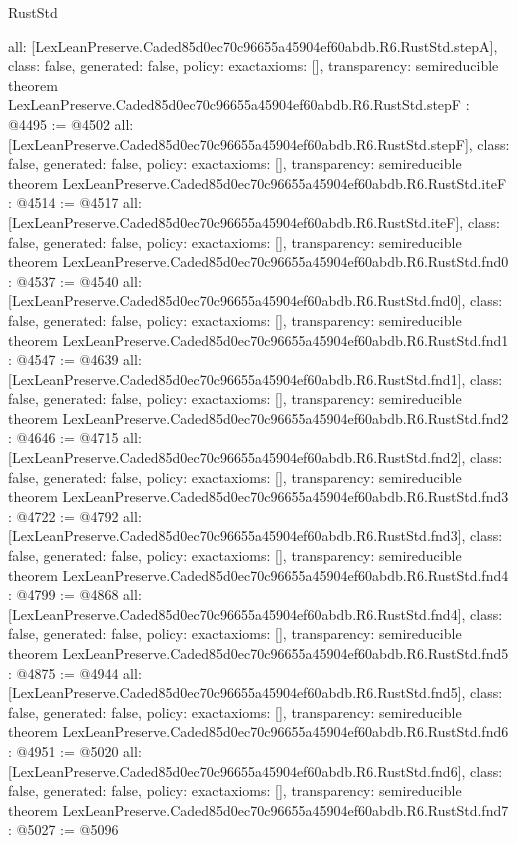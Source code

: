 \begin{lexlean}{RustStd}
\begin{coremodule}
{  all: [LexLeanPreserve.Caded85d0ec70c96655a45904ef60abdb.R6.RustStd.stepA],
  class: false,
  generated: false,
  policy: exact{axioms: []},
  transparency: semireducible
}
theorem LexLeanPreserve.Caded85d0ec70c96655a45904ef60abdb.R6.RustStd.stepF : @4495 := @4502 {
  all: [LexLeanPreserve.Caded85d0ec70c96655a45904ef60abdb.R6.RustStd.stepF],
  class: false,
  generated: false,
  policy: exact{axioms: []},
  transparency: semireducible
}
theorem LexLeanPreserve.Caded85d0ec70c96655a45904ef60abdb.R6.RustStd.iteF : @4514 := @4517 {
  all: [LexLeanPreserve.Caded85d0ec70c96655a45904ef60abdb.R6.RustStd.iteF],
  class: false,
  generated: false,
  policy: exact{axioms: []},
  transparency: semireducible
}
theorem LexLeanPreserve.Caded85d0ec70c96655a45904ef60abdb.R6.RustStd.fnd0 : @4537 := @4540 {
  all: [LexLeanPreserve.Caded85d0ec70c96655a45904ef60abdb.R6.RustStd.fnd0],
  class: false,
  generated: false,
  policy: exact{axioms: []},
  transparency: semireducible
}
theorem LexLeanPreserve.Caded85d0ec70c96655a45904ef60abdb.R6.RustStd.fnd1 : @4547 := @4639 {
  all: [LexLeanPreserve.Caded85d0ec70c96655a45904ef60abdb.R6.RustStd.fnd1],
  class: false,
  generated: false,
  policy: exact{axioms: []},
  transparency: semireducible
}
theorem LexLeanPreserve.Caded85d0ec70c96655a45904ef60abdb.R6.RustStd.fnd2 : @4646 := @4715 {
  all: [LexLeanPreserve.Caded85d0ec70c96655a45904ef60abdb.R6.RustStd.fnd2],
  class: false,
  generated: false,
  policy: exact{axioms: []},
  transparency: semireducible
}
theorem LexLeanPreserve.Caded85d0ec70c96655a45904ef60abdb.R6.RustStd.fnd3 : @4722 := @4792 {
  all: [LexLeanPreserve.Caded85d0ec70c96655a45904ef60abdb.R6.RustStd.fnd3],
  class: false,
  generated: false,
  policy: exact{axioms: []},
  transparency: semireducible
}
theorem LexLeanPreserve.Caded85d0ec70c96655a45904ef60abdb.R6.RustStd.fnd4 : @4799 := @4868 {
  all: [LexLeanPreserve.Caded85d0ec70c96655a45904ef60abdb.R6.RustStd.fnd4],
  class: false,
  generated: false,
  policy: exact{axioms: []},
  transparency: semireducible
}
theorem LexLeanPreserve.Caded85d0ec70c96655a45904ef60abdb.R6.RustStd.fnd5 : @4875 := @4944 {
  all: [LexLeanPreserve.Caded85d0ec70c96655a45904ef60abdb.R6.RustStd.fnd5],
  class: false,
  generated: false,
  policy: exact{axioms: []},
  transparency: semireducible
}
theorem LexLeanPreserve.Caded85d0ec70c96655a45904ef60abdb.R6.RustStd.fnd6 : @4951 := @5020 {
  all: [LexLeanPreserve.Caded85d0ec70c96655a45904ef60abdb.R6.RustStd.fnd6],
  class: false,
  generated: false,
  policy: exact{axioms: []},
  transparency: semireducible
}
theorem LexLeanPreserve.Caded85d0ec70c96655a45904ef60abdb.R6.RustStd.fnd7 : @5027 := @5096 {
}
\end{coremodule}
\end{lexlean}
